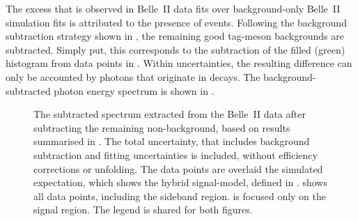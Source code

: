 The excess that is observed in Belle~II data fits over background-only Belle~II simulation fits is attributed to the presence of \BtoXsdgamma events.
Following the background subtraction strategy shown in ,
the remaining good tag-\B meson backgrounds are subtracted.
Simply put, this corresponds to the subtraction of the filled (green) histogram from data points in .
Within uncertainties, the resulting difference can only be accounted by photons that originate in \BtoXsdgamma decays.
The background-subtracted photon energy spectrum is shown in .
\begin{figure}[htbp]
    \caption{\label{fig:subtracted_results}
        The subtracted spectrum extracted from the Belle~II data after subtracting the remaining non-\BtoXsdgamma background,
        based on results summarised in .
        The total uncertainty, that includes background subtraction and fitting uncertainties is included, without efficiency corrections or unfolding.
        The data points are overlaid the simulated expectation, which shows the hybrid signal-model, defined in .
         shows all data points, including the sideband region.
         is focused only on the signal region.
        The legend is shared for both figures.
    }
\end{figure}

